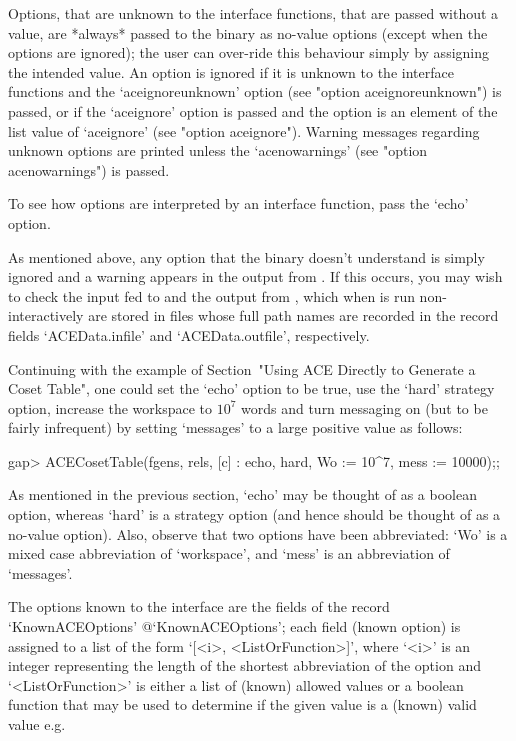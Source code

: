 Options, that are unknown to the {\ACE} interface  functions,  that  are
passed without a value, are *always* passed to the  {\ACE}  binary  as
no-value options (except when the options are ignored); the  user  can
over-ride this behaviour simply by assigning the  intended  value.  An
option is ignored if it is unknown to the {\ACE}  interface  functions
and the `aceignoreunknown' option (see "option  aceignoreunknown")  is
passed, or if the `aceignore' option is passed and the  option  is  an
element of the list value of  `aceignore'  (see  "option  aceignore").
Warning messages regarding unknown  options  are  printed  unless  the
`acenowarnings' (see "option acenowarnings") is passed.

To see how options are interpreted by an  {\ACE}  interface  function,
pass the `echo' option.

As  mentioned  above,  any  option  that  the  {\ACE}  binary  doesn't
understand is simply ignored and a warning appears in the output  from
{\ACE}. If this occurs, you may wish to check the input fed to  {\ACE}
and the output from {\ACE}, which when {\ACE} is run non-interactively
are stored in files whose full path names are recorded in  the  record
fields `ACEData.infile' and `ACEData.outfile', respectively.


Continuing with the example of Section~"Using ACE Directly to Generate
a Coset Table", one could set the `echo' option to be  true,  use  the
`hard' strategy option, increase the workspace  to  $10^7$  words  and
turn messaging on (but to be fairly infrequent) by setting  `messages'
to a large positive value as follows:

\beginexample
gap> ACECosetTable(fgens, rels, [c] : echo, hard, Wo := 10^7, mess := 10000);;
\endexample

As mentioned in the previous section, `echo' may be thought  of  as  a
boolean option, whereas `hard' is a strategy option (and hence  should
be thought of as a no-value option). Also, observe  that  two  options
have  been  abbreviated:  `Wo'  is  a  mixed  case   abbreviation   of
`workspace', and `mess' is an abbreviation of `messages'.


The {\ACE} options known to the {\ACE} interface are the fields of the
record          `KnownACEOptions'{\undoquotes{}
{@`KnownACEOptions'}}; each field (known {\ACE} option) is assigned to
a list of the  form  `[<i>,  <ListOrFunction>]',  where  `<i>'  is  an
integer representing the length of the shortest  abbreviation  of  the
option and `<ListOrFunction>' is either  a  list  of  (known)  allowed
values or a boolean function that may be  used  to  determine  if  the
given value is a (known) valid value e.g.

